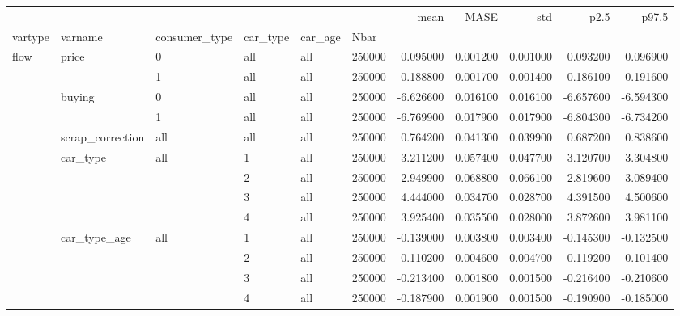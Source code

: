 \begin{tabular}{llllllrrrrr}
\toprule
 &  &  &  &  &  & mean & MASE & std & p2.5 & p97.5 \\
vartype & varname & consumer_type & car_type & car_age & Nbar &  &  &  &  &  \\
\midrule
\multirow[t]{13}{*}{flow} & \multirow[t]{2}{*}{price} & 0 & all & all & 250000 & 0.095000 & 0.001200 & 0.001000 & 0.093200 & 0.096900 \\
\cline{3-11} \cline{4-11} \cline{5-11}
 &  & 1 & all & all & 250000 & 0.188800 & 0.001700 & 0.001400 & 0.186100 & 0.191600 \\
\cline{2-11} \cline{3-11} \cline{4-11} \cline{5-11}
 & \multirow[t]{2}{*}{buying} & 0 & all & all & 250000 & -6.626600 & 0.016100 & 0.016100 & -6.657600 & -6.594300 \\
\cline{3-11} \cline{4-11} \cline{5-11}
 &  & 1 & all & all & 250000 & -6.769900 & 0.017900 & 0.017900 & -6.804300 & -6.734200 \\
\cline{2-11} \cline{3-11} \cline{4-11} \cline{5-11}
 & scrap_correction & all & all & all & 250000 & 0.764200 & 0.041300 & 0.039900 & 0.687200 & 0.838600 \\
\cline{2-11} \cline{3-11} \cline{4-11} \cline{5-11}
 & \multirow[t]{4}{*}{car_type} & \multirow[t]{4}{*}{all} & 1 & all & 250000 & 3.211200 & 0.057400 & 0.047700 & 3.120700 & 3.304800 \\
\cline{4-11} \cline{5-11}
 &  &  & 2 & all & 250000 & 2.949900 & 0.068800 & 0.066100 & 2.819600 & 3.089400 \\
\cline{4-11} \cline{5-11}
 &  &  & 3 & all & 250000 & 4.444000 & 0.034700 & 0.028700 & 4.391500 & 4.500600 \\
\cline{4-11} \cline{5-11}
 &  &  & 4 & all & 250000 & 3.925400 & 0.035500 & 0.028000 & 3.872600 & 3.981100 \\
\cline{2-11} \cline{3-11} \cline{4-11} \cline{5-11}
 & \multirow[t]{4}{*}{car_type_age} & \multirow[t]{4}{*}{all} & 1 & all & 250000 & -0.139000 & 0.003800 & 0.003400 & -0.145300 & -0.132500 \\
\cline{4-11} \cline{5-11}
 &  &  & 2 & all & 250000 & -0.110200 & 0.004600 & 0.004700 & -0.119200 & -0.101400 \\
\cline{4-11} \cline{5-11}
 &  &  & 3 & all & 250000 & -0.213400 & 0.001800 & 0.001500 & -0.216400 & -0.210600 \\
\cline{4-11} \cline{5-11}
 &  &  & 4 & all & 250000 & -0.187900 & 0.001900 & 0.001500 & -0.190900 & -0.185000 \\
\cline{1-11} \cline{2-11} \cline{3-11} \cline{4-11} \cline{5-11}

\end{tabular}
